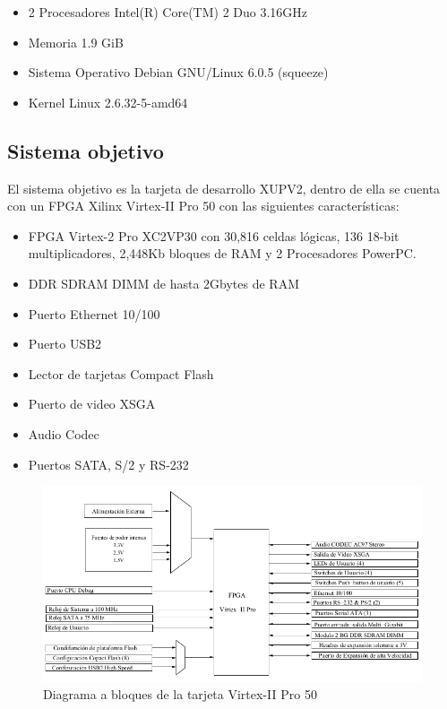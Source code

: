 \begin{itemize}
 \item 2 Procesadores Intel(R) Core(TM) 2 Duo 3.16GHz
 \item Memoria 1.9 GiB
 \item Sistema Operativo Debian GNU/Linux 6.0.5 (squeeze)
 \item Kernel Linux 2.6.32-5-amd64
\end{itemize}


\subsection{Sistema objetivo}

El sistema objetivo es la tarjeta de desarrollo XUPV2, dentro de ella se
cuenta con un FPGA Xilinx Virtex-II Pro 50 con las siguientes características:

  \begin{itemize}
  \item FPGA Virtex-2 Pro XC2VP30  con 30,816 celdas lógicas, 136 18-bit
multiplicadores,
  2,448Kb bloques de RAM y 2 Procesadores PowerPC.
  \item DDR SDRAM DIMM de hasta  2Gbytes de RAM
  \item Puerto Ethernet 10/100
  \item Puerto USB2 
  \item Lector de tarjetas Compact Flash
  \item Puerto de video XSGA
  \item Audio Codec
  \item Puertos SATA, S/2 y RS-232
  \end{itemize}
   
\begin{figure}[ht]
 \centering
 \includegraphics[scale=.50]{./figuras/virtex.png}
 \caption{Diagrama a bloques de la tarjeta Virtex-II Pro 50}
 \label{Diagrama a bloques de la tarjeta Virtex-II Pro 50}
\end{figure}

